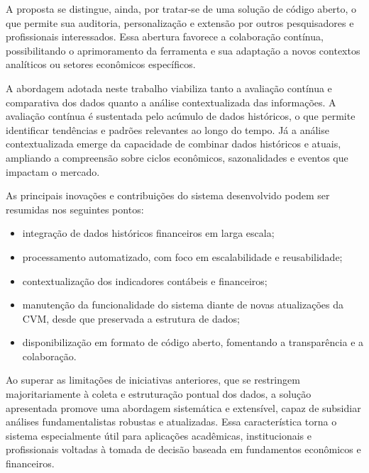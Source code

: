 A proposta se distingue, ainda, por tratar-se de uma solução de código aberto, o que permite sua auditoria, personalização e extensão por outros pesquisadores e profissionais interessados. Essa abertura favorece a colaboração contínua, possibilitando o aprimoramento da ferramenta e sua adaptação a novos contextos analíticos ou setores econômicos específicos.

A abordagem adotada neste trabalho viabiliza tanto a avaliação contínua e comparativa dos dados quanto a análise contextualizada das informações. A avaliação contínua é sustentada pelo acúmulo de dados históricos, o que permite identificar tendências e padrões relevantes ao longo do tempo. Já a análise contextualizada emerge da capacidade de combinar dados históricos e atuais, ampliando a compreensão sobre ciclos econômicos, sazonalidades e eventos que impactam o mercado.

As principais inovações e contribuições do sistema desenvolvido podem ser resumidas nos seguintes pontos:

\begin{itemize}
	\item integração de dados históricos financeiros em larga escala;
	\item processamento automatizado, com foco em escalabilidade e reusabilidade;
	\item contextualização dos indicadores contábeis e financeiros;
	\item manutenção da funcionalidade do sistema diante de novas atualizações da CVM, desde que preservada a estrutura de dados;
	\item disponibilização em formato de código aberto, fomentando a transparência e a colaboração.
\end{itemize}

Ao superar as limitações de iniciativas anteriores, que se restringem majoritariamente à coleta e estruturação pontual dos dados, a solução apresentada promove uma abordagem sistemática e extensível, capaz de subsidiar análises fundamentalistas robustas e atualizadas. Essa característica torna o sistema especialmente útil para aplicações acadêmicas, institucionais e profissionais voltadas à tomada de decisão baseada em fundamentos econômicos e financeiros.